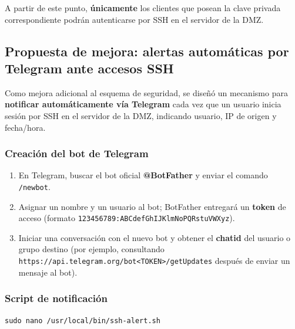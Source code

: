 \documentclass{article}
\providecommand{\tightlist}{%
  \setlength{\itemsep}{0pt}\setlength{\parskip}{0pt}}
\renewcommand{\_}{\oldunderscore\hskip0pt\relax}
\begin{document}
A partir de este punto, \textbf{únicamente} los clientes que posean la
clave privada correspondiente podrán autenticarse por SSH en el servidor
de la DMZ.

\hypertarget{propuesta-de-mejora-alertas-automuxe1ticas-por-telegram-ante-accesos-ssh}{%
\subsection{Propuesta de mejora: alertas automáticas por Telegram ante
accesos
SSH}\label{propuesta-de-mejora-alertas-automuxe1ticas-por-telegram-ante-accesos-ssh}}

Como mejora adicional al esquema de seguridad, se diseñó un mecanismo
para \textbf{notificar automáticamente vía Telegram} cada vez que un
usuario inicia sesión por SSH en el servidor de la DMZ, indicando
usuario, IP de origen y fecha/hora.

\hypertarget{creaciuxf3n-del-bot-de-telegram}{%
\subsubsection{Creación del bot de
Telegram}\label{creaciuxf3n-del-bot-de-telegram}}

\begin{enumerate}
\def\labelenumi{\arabic{enumi}.}
\tightlist
\item
  En Telegram, buscar el bot oficial \textbf{@BotFather} y enviar el
  comando \texttt{/newbot}.
\item
  Asignar un nombre y un usuario al bot; BotFather entregará un
  \textbf{token} de acceso (formato
  \texttt{123456789:ABCdefGhIJKlmNoPQRstuVWXyz}).
\item
  Iniciar una conversación con el nuevo bot y obtener el
  \textbf{chat\_id} del usuario o grupo destino (por ejemplo,
  consultando
  \texttt{https://api.telegram.org/bot\textless{}TOKEN\textgreater{}/getUpdates}
  después de enviar un mensaje al bot).
\end{enumerate}

\newpage
\hypertarget{script-de-notificaciuxf3n}{%
\subsubsection{Script de notificación}\label{script-de-notificaciuxf3n}}

\begin{Verbatim}[fontsize=\footnotesize,frame=single,rulecolor=\color{codebg},fillcolor=\color{codebg},framesep=2mm,xleftmargin=1mm,xrightmargin=1mm,breaklines=true,breakanywhere=true,breaksymbolleft={},breaksymbolright={}]
sudo nano /usr/local/bin/ssh-alert.sh
\end{Verbatim}
\end{document}
